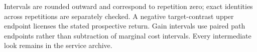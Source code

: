 \noindent Intervals are rounded outward and correspond to repetition zero; exact identities across repetitions are separately checked. A negative target-contrast upper endpoint licenses the stated prospective return. Gain intervals use paired path endpoints rather than subtraction of marginal cost intervals. Every intermediate look remains in the service archive.
\endgroup
